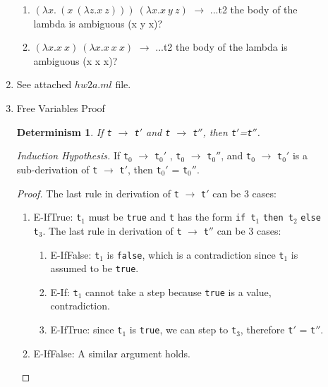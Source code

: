 \documentclass{article}
\newtheorem{deter}{Determinism}
\begin{document}
\begin{description}
\begin{enumerate}
\begin{enumerate}
    \item $(\lambda x.\ (x\ (\lambda z.x\ z)))\ (\lambda x.x\ y\ z)$ $\longrightarrow$ 
          ...t2 the body of the lambda is ambiguous (x y x)?

    \item $(\lambda x.x\ x)\ (\lambda x.x\ x\ x)$ $\longrightarrow$ 
          ...t2 the body of the lambda is ambiguous (x x x)?




    \end{enumerate}

  \item{See attached $hw2a.ml$ file.}

  \item{Free Variables Proof}
    \begin{deter}If \verb|t| $\longrightarrow$ \verb|t|$'$ and \verb|t| $\longrightarrow$ \verb|t|$''$, then \verb|t|$'$=\verb|t|$''$.
    \end{deter}

    \textit{Induction Hypothesis.} If \verb|t|$_0$ $\longrightarrow$ \verb|t|$_0'$ , \verb|t|$_0$ $\longrightarrow$ \verb|t|$_0''$, and \verb|t|$_0$ $\longrightarrow$ \verb|t|$_0'$ is a sub-derivation of \verb|t| $\longrightarrow$ \verb|t|$'$, then \verb|t|$_0'$ = \verb|t|$_0''$.

    \begin{proof}
      The last rule in derivation of \verb|t| $\longrightarrow$ \verb|t|$'$ can be 3 cases:
      \begin{enumerate}
        \item E-IfTrue: \verb|t|$_1$ must be \verb|true| and \verb|t| has the form
        \verb|if t|$_1$ \verb|then t|$_2$ \verb|else t|$_3$.
          The last rule in derivation of \verb|t| $\longrightarrow$ \verb|t|$''$ can be 3 cases:
          \begin{enumerate}
            \item E-IfFalse: \verb|t|$_1$ is \verb|false|, which is a contradiction since \verb|t|$_1$ is assumed to be \verb|true|.
            \item E-If: \verb|t|$_1$ cannot take a step because \verb|true| is a value, contradiction.
            \item E-IfTrue: since \verb|t|$_1$ is \verb|true|, we can step to \verb|t|$_3$, therefore \verb|t|$'$ = \verb|t|$''$.
          \end{enumerate}

        \item E-IfFalse: A similar argument holds.


\end{enumerate}
\end{proof}
\end{enumerate}
\end{description}
\end{document}
